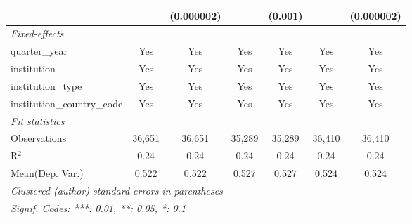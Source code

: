 \begin{tabular}{lcccccc}
                                      &         & (0.000002)    &               & (0.001)       &         & (0.000002)\\   
   \midrule
   \emph{Fixed-effects}\\
   quarter\_year                      & Yes     & Yes           & Yes           & Yes           & Yes     & Yes\\  
   institution                        & Yes     & Yes           & Yes           & Yes           & Yes     & Yes\\  
   institution\_type                  & Yes     & Yes           & Yes           & Yes           & Yes     & Yes\\  
   institution\_country\_code         & Yes     & Yes           & Yes           & Yes           & Yes     & Yes\\  
   \midrule
   \emph{Fit statistics}\\
   Observations                       & 36,651  & 36,651        & 35,289        & 35,289        & 36,410  & 36,410\\  
   R$^2$                              & 0.24    & 0.24          & 0.24          & 0.24          & 0.24    & 0.24\\  
Mean(Dep. Var.) & 0.522 & 0.522 & 0.527 & 0.527 & 0.524 & 0.524 \\
   \midrule \midrule
   \multicolumn{7}{l}{\emph{Clustered (author) standard-errors in parentheses}}\\
   \multicolumn{7}{l}{\emph{Signif. Codes: ***: 0.01, **: 0.05, *: 0.1}}\\
\end{tabular}
\par\endgroup
